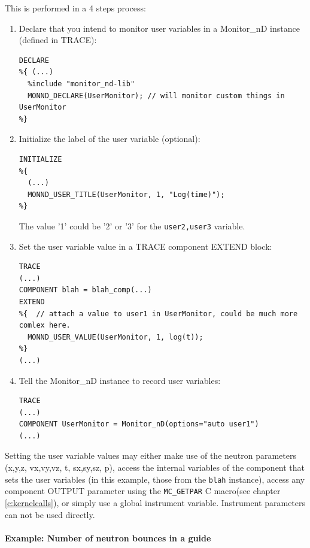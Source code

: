 This is performed in a 4 steps process:
\begin{enumerate}
\item Declare that you intend to monitor user variables in a Monitor\_nD instance (defined in TRACE):
\begin{lstlisting}
DECLARE
%{ (...)
  %include "monitor_nd-lib"
  MONND_DECLARE(UserMonitor); // will monitor custom things in UserMonitor
%}
\end{lstlisting}
\item Initialize the label of the user variable (optional):
\begin{lstlisting}
INITIALIZE
%{
  (...)
  MONND_USER_TITLE(UserMonitor, 1, "Log(time)");
%}
\end{lstlisting}
The value '1' could be '2' or '3' for the \verb+user2,user3+ variable.
\item Set the user variable value in a TRACE component EXTEND block:
\begin{lstlisting}
TRACE
(...)
COMPONENT blah = blah_comp(...)
EXTEND
%{  // attach a value to user1 in UserMonitor, could be much more comlex here.
  MONND_USER_VALUE(UserMonitor, 1, log(t));
%}
(...)
\end{lstlisting}
\item Tell the Monitor\_nD instance to record user variables:
\begin{lstlisting}
TRACE
(...)
COMPONENT UserMonitor = Monitor_nD(options="auto user1")
(...)
\end{lstlisting}
\end{enumerate}
Setting the user variable values may either make use of the neutron parameters (x,y,z, vx,vy,vz, t, sx,sy,sz, p), access the internal variables of the component that sets the user variables (in this example, those from the \verb+blah+ instance), access any component OUTPUT parameter  using the \verb+MC_GETPAR+ C macro(see chapter \ref{c:kernelcalls}), or simply use a global instrument variable. Instrument parameters can not be used directly.

\paragraph{Example: Number of neutron bounces in a guide}

